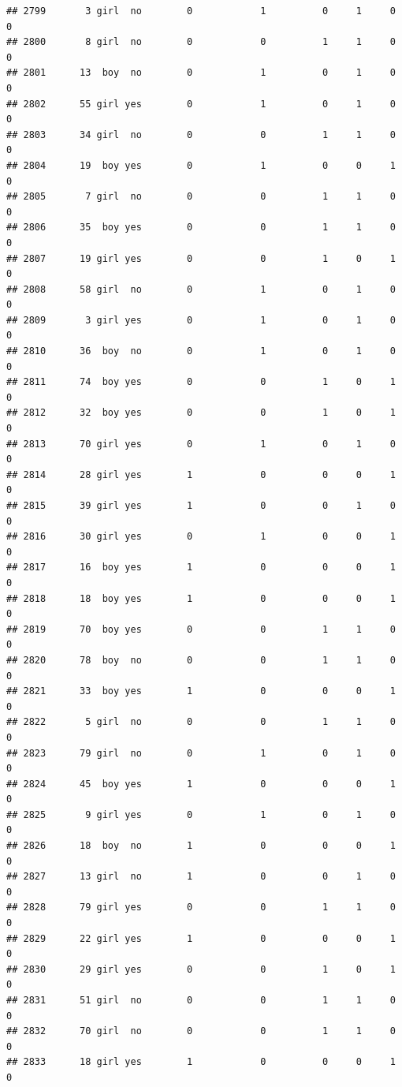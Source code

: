 \documentclass[man]{apa6}
\begin{document}
\begin{verbatim}
## 2799       3 girl  no        0            1          0     1     0     0
## 2800       8 girl  no        0            0          1     1     0     0
## 2801      13  boy  no        0            1          0     1     0     0
## 2802      55 girl yes        0            1          0     1     0     0
## 2803      34 girl  no        0            0          1     1     0     0
## 2804      19  boy yes        0            1          0     0     1     0
## 2805       7 girl  no        0            0          1     1     0     0
## 2806      35  boy yes        0            0          1     1     0     0
## 2807      19 girl yes        0            0          1     0     1     0
## 2808      58 girl  no        0            1          0     1     0     0
## 2809       3 girl yes        0            1          0     1     0     0
## 2810      36  boy  no        0            1          0     1     0     0
## 2811      74  boy yes        0            0          1     0     1     0
## 2812      32  boy yes        0            0          1     0     1     0
## 2813      70 girl yes        0            1          0     1     0     0
## 2814      28 girl yes        1            0          0     0     1     0
## 2815      39 girl yes        1            0          0     1     0     0
## 2816      30 girl yes        0            1          0     0     1     0
## 2817      16  boy yes        1            0          0     0     1     0
## 2818      18  boy yes        1            0          0     0     1     0
## 2819      70  boy yes        0            0          1     1     0     0
## 2820      78  boy  no        0            0          1     1     0     0
## 2821      33  boy yes        1            0          0     0     1     0
## 2822       5 girl  no        0            0          1     1     0     0
## 2823      79 girl  no        0            1          0     1     0     0
## 2824      45  boy yes        1            0          0     0     1     0
## 2825       9 girl yes        0            1          0     1     0     0
## 2826      18  boy  no        1            0          0     0     1     0
## 2827      13 girl  no        1            0          0     1     0     0
## 2828      79 girl yes        0            0          1     1     0     0
## 2829      22 girl yes        1            0          0     0     1     0
## 2830      29 girl yes        0            0          1     0     1     0
## 2831      51 girl  no        0            0          1     1     0     0
## 2832      70 girl  no        0            0          1     1     0     0
## 2833      18 girl yes        1            0          0     0     1     0

\end{verbatim}
\end{document}
